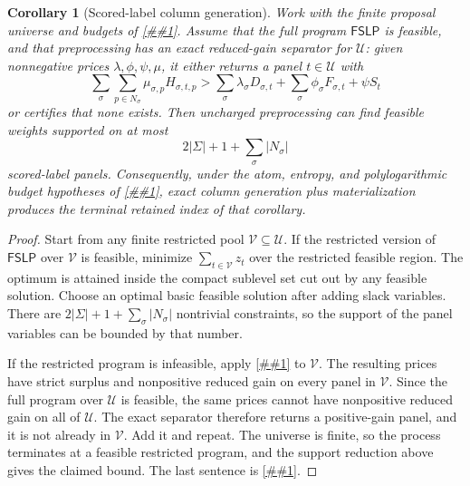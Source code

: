 \documentclass[10pt]{article}
\newcommand{\cref}[1]{\ref{##1}}
\newtheorem{corollary}[theorem]{Corollary}
\theoremstyle{definition}
\begin{document}
\begin{corollary}[Scored-label column generation]
   \label{cor:scored-label-column-generation}
   Work with the finite proposal universe and budgets of
   \cref{lem:finite-scored-label-lp-dual}.  Assume that the full program
   \(\mathsf{FSLP}\) is feasible, and that preprocessing has an exact
   reduced-gain separator for \(\mathcal U\): given nonnegative prices
   \(\lambda,\phi,\psi,\mu\), it either returns a panel \(t\in\mathcal U\)
   with
   \[
      \sum_\sigma\sum_{p\in N_\sigma}\mu_{\sigma,p}H_{\sigma,t,p}
      >
      \sum_\sigma\lambda_\sigma D_{\sigma,t}
      +
      \sum_\sigma\phi_\sigma F_{\sigma,t}
      +
      \psi S_t
      \tag{FSLG}
   \]
   or certifies that none exists.  Then uncharged preprocessing can find
   feasible weights supported on at most
   \[
      2|\Sigma|+1+\sum_\sigma|N_\sigma|
   \]
   scored-label panels.  Consequently, under the atom, entropy, and
   polylogarithmic budget hypotheses of
   \cref{cor:fractional-scored-label-terminal}, exact column generation plus
   materialization produces the terminal retained index of that corollary.
\end{corollary}

\begin{proof}
   Start from any finite restricted pool \(\mathcal V\subseteq\mathcal U\).
   If the restricted version of \(\mathsf{FSLP}\) over \(\mathcal V\) is
   feasible, minimize \(\sum_{t\in\mathcal V}z_t\) over the restricted
   feasible region.  The optimum is attained inside the compact sublevel set
   cut out by any feasible solution.  Choose an optimal basic feasible solution
   after adding slack variables.  There are
   \(2|\Sigma|+1+\sum_\sigma|N_\sigma|\) nontrivial constraints, so the
   support of the panel variables can be bounded by that number.

   If the restricted program is infeasible, apply
   \cref{lem:finite-scored-label-lp-dual} to \(\mathcal V\).  The resulting
   prices have strict surplus and nonpositive reduced gain on every panel in
   \(\mathcal V\).  Since the full program over \(\mathcal U\) is feasible,
   the same prices cannot have nonpositive reduced gain on all of
   \(\mathcal U\).  The exact separator therefore returns a positive-gain
   panel, and it is not already in \(\mathcal V\).  Add it and repeat.  The
   universe is finite, so the process terminates at a feasible restricted
   program, and the support reduction above gives the claimed bound.  The last
   sentence is \cref{cor:fractional-scored-label-terminal}.
\end{proof}
\end{document}

